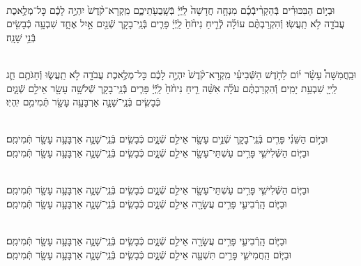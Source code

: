 \documentclass[twoside, openany, parskip=half, 11pt]{book}
\begin{document}
\\
וּבְי֣וֹם הַבִּכּוּרִ֗ים בְּֿהַקְרִ֨יבְֿכֶ֜ם מִנְחָ֤ה חֲדָשָׁה֙ לַֽיְֿיָ֔ בְּֿשָֽׁבֻעֹ֖תֵיכֶ֑ם מִֽקְרָא־קֹ֨דֶשׁ֙ יִהְיֶ֣ה לָכֶ֔ם כׇּל־מְלֶ֥אכֶת עֲבֹדָ֖ה לֹ֥א תַֽעֲשֽׂוּ׃ וְֿהִקְרַבְתֶּ֨ם עוֹלָ֜ה לְֿרֵ֤יחַ נִיחֹ֨חַ֙ לַֽיְֿיָ֔ פָּרִ֧ים בְּֿנֵֽי־בָקָ֛ר שְֿׁנַ֖יִם אַ֣יִל אֶחָ֑ד שִׁבְעָ֥ה כְֿבָשִׂ֖ים בְּֿנֵ֥י שָׁנָֽה׃

\clearpage

\vspace{-\baselineskip}
\\
וּבַֽחֲמִשָּׁה֩ עָשָׂ֨ר י֜וֹם לַחֹ֣דֶשׁ הַשְּֿׁבִיעִ֗י מִֽקְרָא־קֹ֨דֶשׁ֙ יִהְיֶ֣ה לָכֶ֔ם כׇּל־מְלֶ֥אכֶת עֲבֹדָ֖ה לֹ֣א תַֽעֲשׂ֑וּ וְֿחַגֹּתֶ֥ם חַ֛ג לַֽייָ֖ שִׁבְעַ֥ת יָמִֽים׃ וְֿהִקְרַבְתֶּ֨ם עֹלָ֜ה אִשֵּׁ֨ה רֵ֤יחַ נִיחֹ֨חַ֙ לַֽיְֿיָ֔ פָּרִ֧ים בְּֿנֵֽי־בָקָ֛ר שְֿׁלֹשָׁ֥ה עָשָׂ֖ר אֵילִ֣ם שְֿׁנָ֑יִם כְּֿבָשִׂ֧ים בְּֿנֵֽי־שָׁנָ֛ה אַרְבָּעָ֥ה עָשָׂ֖ר תְּֿמִימִ֥ם יִֽהְיֽוּ׃



\\
וּבַיּ֣וֹם הַשֵּׁנִ֗י פָּרִ֧ים בְּֿנֵֽי־בָקָ֛ר שְֿׁנֵ֥ים עָשָׂ֖ר אֵילִ֣ם שְֿׁנָ֑יִם כְּֿבָשִׂ֧ים בְּֿנֵֽי־שָׁנָ֛ה אַרְבָּעָ֥ה עָשָׂ֖ר תְּֿמִימִֽם׃
\\
וּבַיּ֧וֹם הַשְּֿׁלִישִׁ֛י פָּרִ֥ים עַשְׁתֵּי־עָשָׂ֖ר אֵילִ֣ם שְֿׁנָ֑יִם כְּֿבָשִׂ֧ים בְּֿנֵֽי־שָׁנָ֛ה אַרְבָּעָ֥ה עָשָׂ֖ר תְּֿמִימִֽם׃



\\
וּבַיּ֧וֹם הַשְּֿׁלִישִׁ֛י פָּרִ֥ים עַשְׁתֵּי־עָשָׂ֖ר אֵילִ֣ם שְֿׁנָ֑יִם כְּֿבָשִׂ֧ים בְּֿנֵֽי־שָׁנָ֛ה אַרְבָּעָ֥ה עָשָׂ֖ר תְּֿמִימִֽם׃
\\
וּבַיּ֧וֹם הָֽרְֿבִיעִ֛י פָּרִ֥ים עֲשָׂרָ֖ה אֵילִ֣ם שְֿׁנָ֑יִם כְּֿבָשִׂ֧ים בְּֿנֵֽי־שָׁנָ֛ה אַרְבָּעָ֥ה עָשָׂ֖ר תְּֿמִימִֽם׃



\\
וּבַיּ֧וֹם הָֽרְֿבִיעִ֛י פָּרִ֥ים עֲשָׂרָ֖ה אֵילִ֣ם שְֿׁנָ֑יִם כְּֿבָשִׂ֧ים בְּֿנֵֽי־שָׁנָ֛ה אַרְבָּעָ֥ה עָשָׂ֖ר תְּֿמִימִֽם׃
\\
וּבַיּ֧וֹם הַֽחֲמִישִׁ֛י פָּרִ֥ים תִּשְׁעָ֖ה אֵילִ֣ם שְֿׁנָ֑יִם כְּֿבָשִׂ֧ים בְּֿנֵֽי־שָׁנָ֛ה אַרְבָּעָ֥ה עָשָׂ֖ר תְּֿמִימִֽם׃
\end{document}
